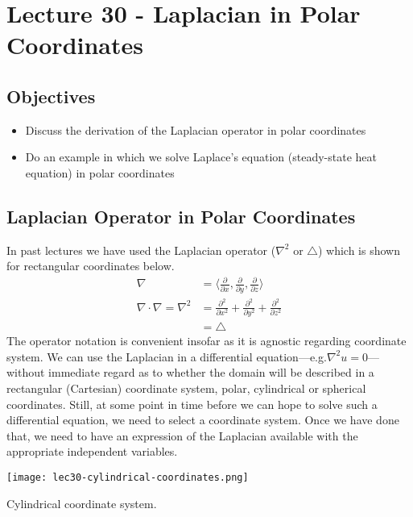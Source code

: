 \chapter{Lecture 30 - Laplacian in Polar Coordinates}
\label{ch:lec30}
\section{Objectives}
\begin{itemize}
\item Discuss the derivation of the Laplacian operator in polar coordinates
\item Do an example in which we solve Laplace's equation (steady-state heat equation) in polar coordinates
\end{itemize}
\setcounter{lstannotation}{0}

\section{Laplacian Operator in Polar Coordinates}

In past lectures we have used the Laplacian operator ($\nabla^2$ or $\bigtriangleup$) which is shown for rectangular coordinates below.
\begin{align*}
\nabla &= \langle \frac{\partial}{\partial x}, \frac{\partial}{\partial y}, \frac{\partial}{\partial z} \rangle \\
\nabla \cdot \nabla = \nabla^2 &= \frac{\partial^2}{\partial x^2} + \frac{\partial^2}{\partial y^2} + \frac{\partial^2}{\partial z^2} \\
&= \bigtriangleup
\end{align*}
The operator notation is convenient insofar as it is agnostic regarding coordinate system.  We can use the Laplacian in a differential equation---e.g.$\nabla^2u = 0$---without immediate regard as to whether the domain will be described in a rectangular (Cartesian) coordinate system, polar, cylindrical or spherical coordinates.  Still, at some point in time before we can hope to solve such a differential equation, we need to select a coordinate system.  Once we have done that, we need to have an expression of the Laplacian available with the appropriate independent variables.  
\begin{marginfigure}
\texttt{[image: lec30-cylindrical-coordinates.png]}
\caption{Cylindrical coordinate system.}
\label{fig:lec30-cylindrical-coordinates}
\end{marginfigure}

